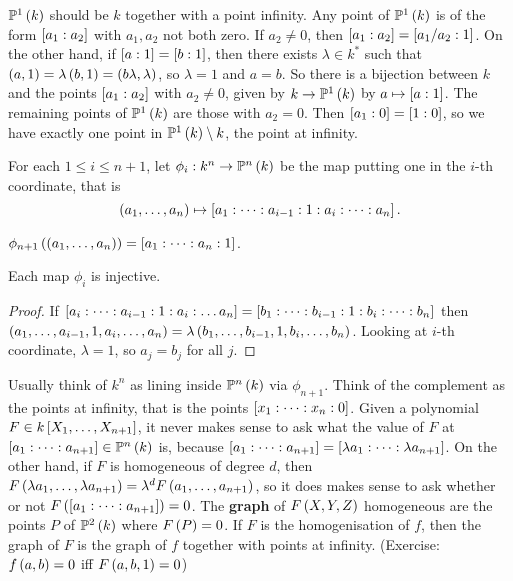\begin{example*}
$ \P^1\rb{k} $ should be $ k $ together with a point infinity. Any point of $ \P^1\rb{k} $ is of the form $ \sb{a_1 : a_2} $ with $ a_1, a_2 $ not both zero. If $ a_2 \ne 0 $, then $ \sb{a_1 : a_2} = \sb{a_1 / a_2 : 1} $. On the other hand, if $ \sb{a : 1} = \sb{b : 1} $, then there exists $ \lambda \in k^* $ such that $ \rb{a, 1} = \lambda\rb{b, 1} = \rb{b\lambda, \lambda} $, so $ \lambda = 1 $ and $ a = b $. So there is a bijection between $ k $ and the points $ \sb{a_1 : a_2} $ with $ a_2 \ne 0 $, given by $ k \to \P^1\rb{k} $ by $ a \mapsto \sb{a : 1} $. The remaining points of $ \P^1\rb{k} $ are those with $ a_2 = 0 $. Then $ \sb{a_1 : 0} = \sb{1 : 0} $, so we have exactly one point in $ \P^1\rb{k} \setminus k $, the point at infinity.
\end{example*}

For each $ 1 \le i \le n + 1 $, let $ \phi_i : k^n \to \P^n\rb{k} $ be the map putting one in the $ i $-th coordinate, that is
$$ \rb{a_1, \dots, a_n} \mapsto \sb{a_1 : \dots : a_{i - 1} : 1 : a_i : \dots : a_n}. $$

\begin{example*}
$ \phi_{n + 1}\rb{\rb{a_1, \dots, a_n}} = \sb{a_1 : \dots : a_n : 1} $.
\end{example*}

\begin{lemma}
Each map $ \phi_i $ is injective.
\end{lemma}

\begin{proof}
If $ \sb{a_i : \dots : a_{i - 1} : 1 : a_i : \dots a_n} = \sb{b_1 : \dots : b_{i - 1} : 1 : b_i : \dots : b_n} $ then $ \rb{a_1, \dots, a_{i - 1}, 1, a_i, \dots, a_n} = \lambda\rb{b_1, \dots, b_{i - 1}, 1, b_i, \dots, b_n} $. Looking at $ i $-th coordinate, $ \lambda = 1 $, so $ a_j = b_j $ for all $ j $.
\end{proof}

Usually think of $ k^n $ as lining inside $ \P^n\rb{k} $ via $ \phi_{n + 1} $. Think of the complement as the points at infinity, that is the points $ \sb{x_1 : \dots : x_n : 0} $. Given a polynomial $ F \in k\sb{X_1, \dots, X_{n + 1}} $, it never makes sense to ask what the value of $ F $ at $ \sb{a_1 : \dots : a_{n + 1}} \in \P^n\rb{k} $ is, because $ \sb{a_1 : \dots : a_{n + 1}} = \sb{\lambda a_1 : \dots : \lambda a_{n + 1}} $. On the other hand, if $ F $ is homogeneous of degree $ d $, then $ F\rb{\lambda a_1, \dots, \lambda a_{n + 1}} = \lambda^d F\rb{a_1, \dots, a_{n + 1}} $, so it does makes sense to ask whether or not $ F\rb{\sb{a_1 : \dots : a_{n + 1}}} = 0 $. The \textbf{graph} of $ F\rb{X, Y, Z} $ homogeneous are the points $ P $ of $ \P^2\rb{k} $ where $ F\rb{P} = 0 $. If $ F $ is the homogenisation of $ f $, then the graph of $ F $ is the graph of $ f $ together with points at infinity. (Exercise: $ f\rb{a, b} = 0 $ iff $ F\rb{a, b, 1} = 0 $)

